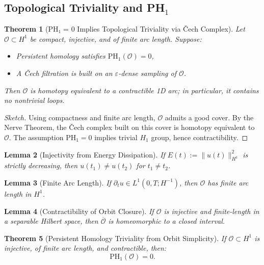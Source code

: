 \documentclass[11pt]{article}
\newtheorem{theorem}{Theorem}[section]
\newtheorem{lemma}[theorem]{Lemma}
\theoremstyle{definition}
\begin{document}
\subsection{Topological Triviality and PH$_1$}

\begin{theorem}[PH₁ = 0 Implies Topological Triviality via Čech Complex]
\label{thm:cech-triviality}
Let $\mathcal{O} \subset H^1$ be compact, injective, and of finite arc length. Suppose:
\begin{itemize}
  \item Persistent homology satisfies $\mathrm{PH}_1(\mathcal{O}) = 0$,
  \item A Čech filtration is built on an $\varepsilon$-dense sampling of $\mathcal{O}$.
\end{itemize}
Then $\mathcal{O}$ is homotopy equivalent to a contractible 1D arc; in particular, it contains no nontrivial loops.
\end{theorem}

\begin{proof}[Sketch]
Using compactness and finite arc length, $\mathcal{O}$ admits a good cover. By the Nerve Theorem, the Čech complex built on this cover is homotopy equivalent to $\mathcal{O}$. The assumption $\mathrm{PH}_1 = 0$ implies trivial $H_1$ group, hence contractibility.
\end{proof}

\begin{lemma}[Injectivity from Energy Dissipation]
If $E(t) := \|u(t)\|^2_{H^1}$ is strictly decreasing, then $u(t_1) \neq u(t_2)$ for $t_1 \neq t_2$.
\end{lemma}

\begin{lemma}[Finite Arc Length]
If $\partial_t u \in L^1(0,T; H^{-1})$, then $\mathcal{O}$ has finite arc length in $H^1$.
\end{lemma}

\begin{lemma}[Contractibility of Orbit Closure]
If $\mathcal{O}$ is injective and finite-length in a separable Hilbert space, then $\overline{\mathcal{O}}$ is homeomorphic to a closed interval.
\end{lemma}

\begin{theorem}[Persistent Homology Triviality from Orbit Simplicity]
\label{thm:ph1-triviality}
If $\mathcal{O} \subset H^1$ is injective, of finite arc length, and contractible, then:
\[
\mathrm{PH}_1(\mathcal{O}) = 0.
\]
\end{theorem}
\end{document}
